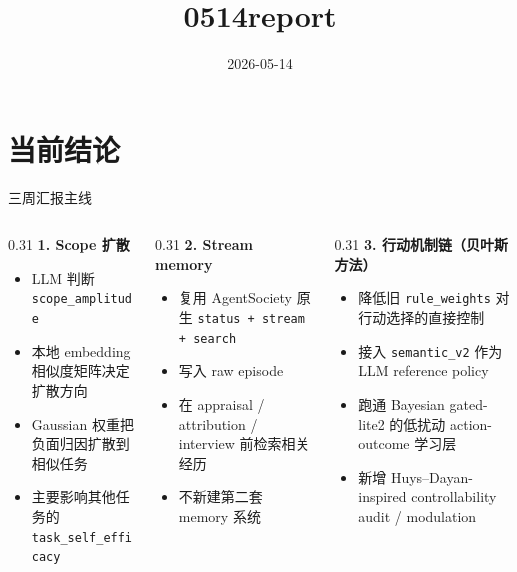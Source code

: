 \documentclass[aspectratio=169]{beamer}
\title[0514report]{0514report}
\subtitle{}
\date{2026-05-14}
\begin{document}
\begin{frame}
    \titlepage
\end{frame}

\section{当前结论}

\begin{frame}[t]{三周汇报主线}
\small
\begin{columns}[T]
\begin{column}{0.31\textwidth}
\textbf{1. Scope 扩散}
\begin{itemize}
    \item LLM 判断 \texttt{scope\_amplitude}
    \item 本地 embedding 相似度矩阵决定扩散方向
    \item Gaussian 权重把负面归因扩散到相似任务
    \item 主要影响其他任务的 \texttt{task\_self\_efficacy}
\end{itemize}
\end{column}

\begin{column}{0.31\textwidth}
\textbf{2. Stream memory}
\begin{itemize}
    \item 复用 AgentSociety 原生 \texttt{status + stream + search}
    \item 写入 raw episode
    \item 在 appraisal / attribution / interview 前检索相关经历
    \item 不新建第二套 memory 系统
\end{itemize}
\end{column}

\begin{column}{0.31\textwidth}
\textbf{3. 行动机制链（贝叶斯方法）}
\begin{itemize}
    \item 降低旧 \texttt{rule\_weights} 对行动选择的直接控制
    \item 接入 \texttt{semantic\_v2} 作为 LLM reference policy
    \item 跑通 Bayesian gated-lite2 的低扰动 action-outcome 学习层
    \item 新增 Huys--Dayan-inspired controllability audit / modulation
\end{itemize}
\end{column}
\end{columns}
\end{frame}
\end{document}
